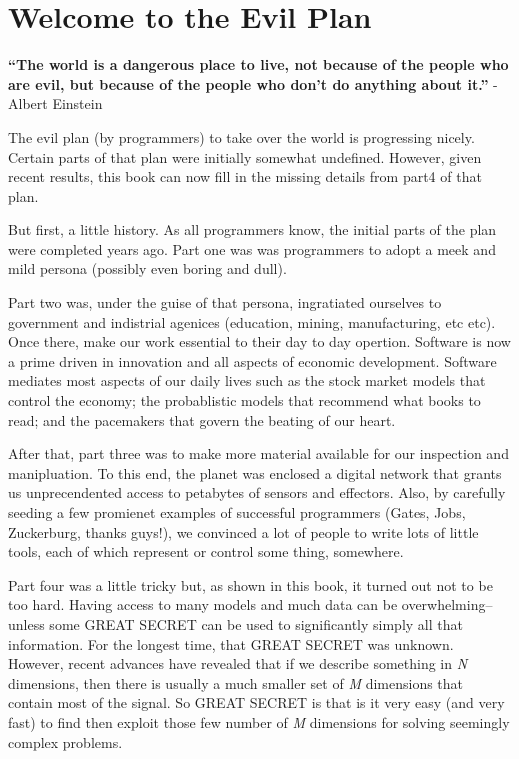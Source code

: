 \section{Welcome to the Evil Plan}\label{welcome-to-the-evil-plan}

\textbf{``The world is a dangerous place to live, not because of the
people who are evil, but because of the people who don't do anything
about it.''} - Albert Einstein

The evil plan (by programmers) to take over the world is progressing
nicely. Certain parts of that plan were initially somewhat undefined.
However, given recent results, this book can now fill in the missing
details from part4 of that plan.

But first, a little history. As all programmers know, the initial parts
of the plan were completed years ago. Part one was was programmers to
adopt a meek and mild persona (possibly even boring and dull).

Part two was, under the guise of that persona, ingratiated ourselves to
government and indistrial agenices (education, mining, manufacturing,
etc etc). Once there, make our work essential to their day to day
opertion. Software is now a prime driven in innovation and all aspects
of economic development. Software mediates most aspects of our daily
lives such as the stock market models that control the economy; the
probablistic models that recommend what books to read; and the
pacemakers that govern the beating of our heart.

After that, part three was to make more material available for our
inspection and manipluation. To this end, the planet was enclosed a
digital network that grants us unprecendented access to petabytes of
sensors and effectors. Also, by carefully seeding a few promienet
examples of successful programmers (Gates, Jobs, Zuckerburg, thanks
guys!), we convinced a lot of people to write lots of little tools, each
of which represent or control some thing, somewhere.

Part four was a little tricky but, as shown in this book, it turned out
not to be too hard. Having access to many models and much data can be
overwhelming-- unless some GREAT SECRET can be used to significantly
simply all that information. For the longest time, that GREAT SECRET was
unknown. However, recent advances have revealed that if we describe
something in \emph{N} dimensions, then there is usually a much smaller
set of \emph{M} dimensions that contain most of the signal. So GREAT
SECRET is that is it very easy (and very fast) to find then exploit
those few number of \emph{M} dimensions for solving seemingly complex
problems.

